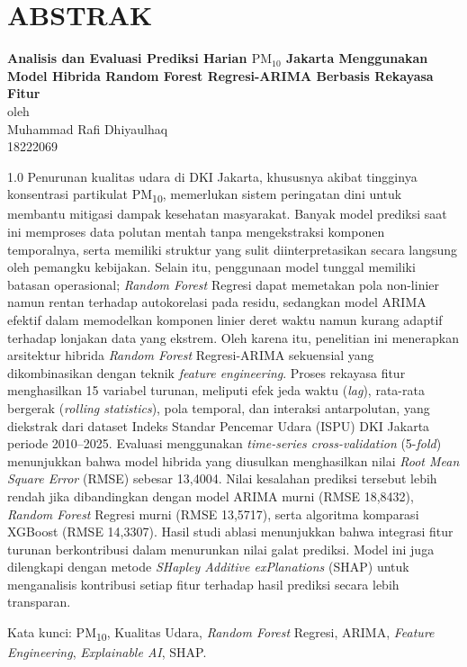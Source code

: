 \chapter*{ABSTRAK}

\begin{center}
   \textbf{Analisis dan Evaluasi Prediksi Harian $\text{PM}_{10}$ Jakarta Menggunakan Model Hibrida Random Forest Regresi-ARIMA Berbasis Rekayasa Fitur} \\
   \vspace{0.4cm}
   oleh \\
   \vspace{0.4cm}
   Muhammad Rafi Dhiyaulhaq\\
   18222069\\
\end{center}

\begin{spacing}{1.0}
Penurunan kualitas udara di DKI Jakarta, khususnya akibat tingginya konsentrasi partikulat PM\textsubscript{10}, memerlukan sistem peringatan dini untuk membantu mitigasi dampak kesehatan masyarakat. Banyak model prediksi saat ini memproses data polutan mentah tanpa mengekstraksi komponen temporalnya, serta memiliki struktur yang sulit diinterpretasikan secara langsung oleh pemangku kebijakan. Selain itu, penggunaan model tunggal memiliki batasan operasional; \textit{Random Forest} Regresi dapat memetakan pola non-linier namun rentan terhadap autokorelasi pada residu, sedangkan model ARIMA efektif dalam memodelkan komponen linier deret waktu namun kurang adaptif terhadap lonjakan data yang ekstrem. Oleh karena itu, penelitian ini menerapkan arsitektur hibrida \textit{Random Forest} Regresi-ARIMA sekuensial yang dikombinasikan dengan teknik \textit{feature engineering}. Proses rekayasa fitur menghasilkan 15 variabel turunan, meliputi efek jeda waktu (\textit{lag}), rata-rata bergerak (\textit{rolling statistics}), pola temporal, dan interaksi antarpolutan, yang diekstrak dari dataset Indeks Standar Pencemar Udara (ISPU) DKI Jakarta periode 2010--2025. Evaluasi menggunakan \textit{time-series cross-validation} (5-\textit{fold}) menunjukkan bahwa model hibrida yang diusulkan menghasilkan nilai \textit{Root Mean Square Error} (RMSE) sebesar 13,4004. Nilai kesalahan prediksi tersebut lebih rendah jika dibandingkan dengan model ARIMA murni (RMSE 18,8432), \textit{Random Forest} Regresi murni (RMSE 13,5717), serta algoritma komparasi XGBoost (RMSE 14,3307). Hasil studi ablasi menunjukkan bahwa integrasi fitur turunan berkontribusi dalam menurunkan nilai galat prediksi. Model ini juga dilengkapi dengan metode \textit{SHapley Additive exPlanations} (SHAP) untuk menganalisis kontribusi setiap fitur terhadap hasil prediksi secara lebih transparan.

Kata kunci: PM\textsubscript{10}, Kualitas Udara, \textit{Random Forest} Regresi, ARIMA, \textit{Feature Engineering}, \textit{Explainable AI}, SHAP.
\end{spacing}